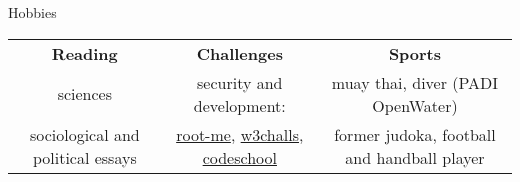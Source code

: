 \begin{rSection}{Hobbies}

  \begin{center}
      \begin{tabular}
          {c | c | c}
          \textbf{Reading} & \textbf{Challenges} & \textbf{Sports} \\
          sciences & security and development: &  muay thai, diver (PADI OpenWater) \\
          sociological and political essays  & \href{http://www.root-me.org/Pamplemouss_?inc=score&lang=en}{root-me}, \href{https://w3challs.com/profile/Pamplemouss_}{w3challs}, \href{https://www.codeschool.com/users/Pamplemouss_}{codeschool} & former judoka, football and handball player \\
      \end{tabular}
  \end{center}

\end{rSection}
